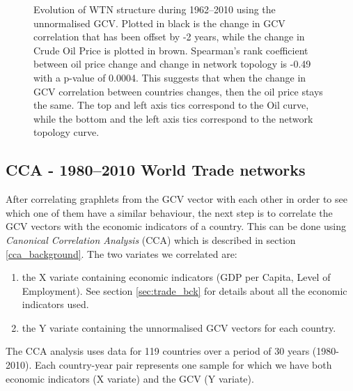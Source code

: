 \begin{figure}[H]
\caption[Evolution of WTN structure during 1962--2010 - unnormalised GCV]{Evolution of WTN structure during 1962--2010 using the unnormalised GCV. Plotted in black is the change in GCV correlation that has been offset by -2 years, while the change in Crude Oil Price is plotted in brown. Spearman's rank coefficient between oil price change and change in network topology is -0.49 with a p-value of 0.0004. This suggests that when the change in GCV correlation between countries changes, then the oil price stays the same. The top and left axis tics correspond to the Oil curve, while the bottom and the left axis tics correspond to the network topology curve.}
\label{change_over_time_orig}
\end{figure}


\subsection{CCA - 1980--2010 World Trade networks}
\label{sec:cca_orig}
After correlating graphlets from the GCV vector with each other in order to see which one of them have a similar behaviour, the next step is to correlate the GCV vectors with the economic indicators of a country. This can be done using \emph{Canonical Correlation Analysis} (CCA) which is described in section \ref{cca_background}. The two variates we correlated are:
\begin{enumerate}
 \item the X variate containing economic indicators (GDP per Capita, Level of Employment). See section \ref{sec:trade_bck} for details about all the economic indicators used.
 \item the Y variate containing the unnormalised GCV vectors for each country.
\end{enumerate}

The CCA analysis uses data for 119 countries over a period of 30 years (1980-2010). Each country-year pair represents one sample for which we have both economic indicators (X variate) and the GCV (Y variate).



